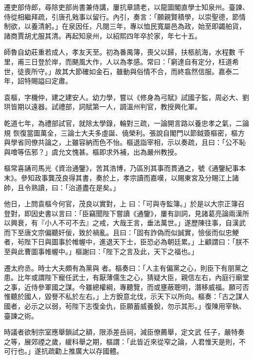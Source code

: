 \begin{pinyinscope}
 遷吏部侍郎，尋除吏部尚書兼侍講，屢抗章請老，以龍圖閣直學士知泉州。臺諫、侍從相繼拜疏，引唐孔戣事以留行。內引，奏言：「願親賢積學，以崇聖德，節情制欲，以養清躬。」在泉因任，凡閱三年，專以恤民寬屬邑為政，始至即蠲舶貨，諸商賈胡尤服其清。再起知泉州，以紹熙四年卒於家，年七十五。



 師魯自幼莊重若成人，孝友天至。初為番禺簿，喪父以歸，扶柩航海，水程數
 千里，甫三日登於岸，而颶風大作，人以為孝感。常曰：「窮達自有定分，枉道希世，徒喪所守。」故其大節確如金石，雖動與俗情不合，而終翕然信服。嘉泰二年，詔特賜謚曰定肅。



 袁樞，字機仲，建之建安人。幼力學，嘗以《修身為弓賦》試國子監，周必大、劉珙皆期以遠器。試禮部，詞賦第一人，調溫州判官，教授興化軍。



 乾道七年，為禮部試官，就除太學錄，輪對三疏，一論開言路以養忠孝之氣，二論規
 恢復當圖萬全，三論士大夫多虛誕、僥榮利。張說自閣門以節鉞簽樞密，樞方與學省同僚共論之，上雖容納而色不怡。樞退詣宰相，示以奏疏，且曰：「公不恥與噲等伍邪？」虞允文愧甚。樞即求外補，出為嚴州教授。



 樞常喜誦司馬光《資治通鑒》，苦其浩博，乃區別其事而貫通之，號《通鑒紀事本末》。參知政事龔茂良得其書，奏於上，孝宗讀而嘉嘆，以賜東宮及分賜江上諸帥，且令熟讀，曰：「治道盡在是矣。」



 他日，上問袁樞今何官，茂良以實對，上
 曰：「可與寺監簿。」於是以大宗正簿召登對，即因史書以言曰：「臣竊聞陛下嘗讀《通鑒》，屢有訓詞，見諸葛亮論兩漢所以興衰，有『小人不可不去』之戒，大哉王言，垂法萬世。」遂歷陳往事，自漢武而下至唐文宗偏聽奸佞，致於禍亂。且曰：「固有詐偽而似誠實，憸佞而似忠鯁者，茍陛下日與圖事於帷幄中，進退天下士，臣恐必為朝廷累。」上顧謂曰：「朕不至與此曹圖事帷幄中。」樞謝曰：「陛下之言及此，天下之福也。」



 遷太府丞。時士大夫頗有為黨與
 者。樞奏曰：「人主有偏黨之心，則臣下有朋黨之患。比年或謂陛下寵任武士，有厭薄儒生之心，猜疑大臣，親信左右，內庭行廟堂之事，近侍參軍國之謀。今雖總權綱，專聽覽，而或壅蔽聰明，潛移威福。願可否惟聽於國人，毀譽不私於左右。」上方銳意北伐，示天下以所向。樞奏：「古之謀人國者，必示之以弱，茍陛下志復金仇，臣願蓄威養銳，勿示其形。」復陳用宰執、臺諫之術。



 時議者欲制宗室應舉鎖試之額，限添差岳祠，減臣僚薦舉，定文武
 任子，嚴特奏之等，展郊禋之歲，緩科舉之期，樞謂：「此皆近來從窄之論，人君惟天是則，不可行也。」遂抗疏勸上推廣大以存國體。




\end{pinyinscope}
